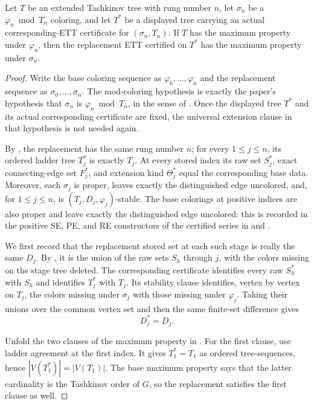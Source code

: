 \begin{lemma}
Let \(T\) be an extended Tashkinov tree with rung number \(n\), let
\(\sigma_n\) be a \(\varphi_n\bmod T_n\) coloring, and let \(T^*\) be a
displayed tree carrying an actual corresponding-ETT certificate for
\((\sigma_n,T_n)\).  If \(T\) has the maximum property under
\(\varphi_n\), then the replacement ETT certified on \(T^*\) has the
maximum property under \(\sigma_n\).
\end{lemma}
\begin{proof}
Write the base coloring sequence as
\(\varphi_0,\ldots,\varphi_n\) and the replacement sequence as
\(\sigma_0,\ldots,\sigma_n\).  The mod-coloring hypothesis is exactly
the paper's hypothesis that \(\sigma_n\) is
\(\varphi_n\bmod T_n\), in the sense of .  Once the
displayed tree \(T^*\) and its actual corresponding certificate are fixed,
the universal extension clause in that hypothesis is not needed again.

By , the replacement has the
same rung number \(n\); for every \(1\leq j\leq n\), its ordered ladder
tree \(T_j^*\) is exactly \(T_j\).  At every stored index its raw set
\(S_j^*\), exact connecting-edge set \(F_j^*\), and extension kind
\(\Theta_j^*\) equal the corresponding base data.  Moreover, each
\(\sigma_j\) is proper, leaves exactly the distinguished edge uncolored,
and, for \(1\leq j\leq n\), is
\((T_j,D_j,\varphi_j)\)-stable.  The base colorings at positive indices
are also proper and leave exactly the distinguished edge uncolored: this
is recorded in the positive SE, PE, and RE constructors of the certified
series in  and
.

We first record that the replacement stored set at each such stage is
really the same \(D_j\).  By , it is the
union of the raw sets \(S_h\) through \(j\), with the colors missing on
the stage tree deleted.  The corresponding certificate identifies every
raw \(S_h^*\) with \(S_h\) and identifies \(T_j^*\) with \(T_j\).
Its stability clause identifies, vertex by vertex on \(T_j\), the colors
missing under \(\sigma_j\) with those missing under \(\varphi_j\).
Taking their unions over the common vertex set and then the same finite-set
difference gives
\[
                         D_j^*=D_j.                 \tag{1}
\]

Unfold the two clauses of the maximum property in
.  For the first clause, use ladder agreement at
the first index.  It gives \(T_1^*=T_1\) as ordered tree-sequences, hence
\(|V(T_1^*)|=|V(T_1)|\).  The base maximum property says that the latter
cardinality is the Tashkinov order of \(G\), so the replacement satisfies
the first clause as well.


\end{proof}
